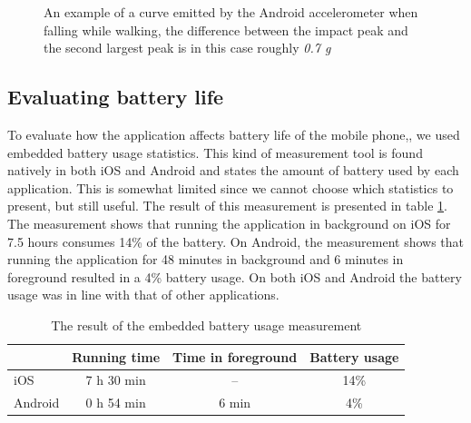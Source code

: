 \documentclass[12pt, a4paper, onecolumn]{article}
\begin{document}
	\begin{figure}[H]
		
		\centering
		
		\caption{An example of a curve emitted by the Android accelerometer when falling while walking, the difference between the impact peak and the second largest peak is in this case roughly \textit{0.7 g}}%
		\label{fig:difference-android-fall-while-walk}%
	\end{figure}
	
	\newpage
	\subsection{Evaluating battery life}
	
	To evaluate how the application affects battery life of the mobile phone,, we used embedded battery usage statistics. This kind of measurement tool is found natively in both iOS and Android and states the amount of battery used by each application. This is somewhat limited since we cannot choose which statistics to present, but still useful. The result of this measurement is presented in table \ref{table:battery-embedded}. The measurement shows that running the application in background on iOS for 7.5 hours consumes 14\% of the battery. On Android, the measurement shows that running the application for 48 minutes in background and 6 minutes in foreground resulted in a 4\% battery usage. On both iOS and Android the battery usage was in line with that of other applications.

	\begin{table}[H]
		\centering
		\begin{tabular}{|l|c|c|c|}
			\hline
			& Running time & Time in foreground & Battery usage \\ \hline
			iOS     & 7 h 30 min & -- & 14\%        \\ \hline
			Android & 0 h 54 min & 6 min & 4\%        \\ \hline
		\end{tabular}
		\caption{The result of the embedded battery usage measurement}
		\label{table:battery-embedded}
	\end{table}
	\newpage
	
\end{document}
